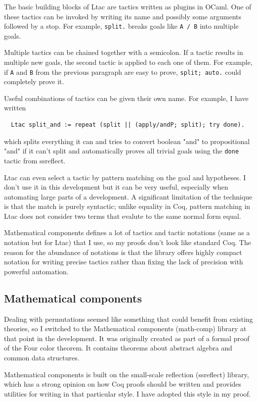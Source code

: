 \documentclass[english, 12pt, a4paper, sci, a-1b, online]{aaltothesis}
\newcommand\icoq[1]{\texttt{#1}}
\begin{document}
The basic building blocks of Ltac are tactics written as plugins in OCaml. One of these tactics can be invoked by writing its name and possibly some arguments followed by a stop. For example, \icoq{split.} breaks goals like \icoq{A /\ B} into multiple goals.

Multiple tactics can be chained together with a semicolon. If a tactic results in multiple new goals, the second tactic is applied to each one of them. For example, if \icoq{A} and \icoq{B} from the previous paragraph are easy to prove, \icoq{split; auto.} could completely prove it.

Useful combinations of tactics can be given their own name. For example, I have written
\begin{verbatim}
  Ltac split_and := repeat (split || (apply/andP; split); try done).
\end{verbatim}
which splits everything it can and tries to convert boolean "and" to propositional "and" if it can't split and automatically proves all trivial goals using the \icoq{done} tactic from ssreflect.

Ltac can even select a tactic by pattern matching on the goal and hypotheses. I don't use it in this development but it can be very useful, especially when automating large parts of a development. A significant limitation of the technique is that the match is purely syntactic; unlike equality in Coq, pattern matching in Ltac does not consider two terms that evalute to the same normal form equal.

Mathematical components defines a lot of tactics and tactic notations (same as a notation but for Ltac) that I use, so my proofs don't look like standard Coq. The reason for the abundance of notations is that the library offers highly compact notation for writing precise tactics rather than fixing the lack of precision with powerful automation.

\subsection{Mathematical components}

Dealing with permutations seemed like something that could benefit from existing theories, so I switched to the Mathematical components (math-comp) library at that point in the development. It was originally created as part of a formal proof of the Four color theorem. It contains theorems about abstract algebra and common data structures.

Mathematical components is built on the small-scale reflection (ssreflect) library, which has a strong opinion on how Coq proofs should be written and provides utilities for writing in that particular style. I have adopted this style in my proof.
\end{document}
